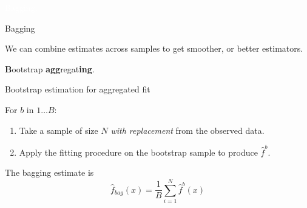 \documentclass[xcolor={table}, handout]{beamer}
\begin{document}


\begin{transitionframe}
\centering

\LARGE \textcolor{white}{Bagging.}

\end{transitionframe}
\begin{frame}{Bagging}

\begin{wideitemize}
\item We can combine estimates across samples to get smoother, or better estimators. \pause
\item \textcolor{Contrast6l}{\textbf{B}}ootstrap \textcolor{Contrast6l}{\textbf{agg}}regat\textcolor{Contrast6l}{\textbf{ing}}.
\end{wideitemize}

\end{frame}



\begin{frame}{Bootstrap estimation for aggregated fit}

\begin{wideitemize}
\item For $b$ in $1\dots B$:\pause
\begin{enumerate}

    \item Take a sample of size $N$  \textit{with replacement} from the observed data. \pause

    \item Apply the fitting procedure on the bootstrap sample to produce $\hat f^b$.
    \end{enumerate}
\pause
\item The bagging estimate is 
\[
\hat f_{bag}(x) = \frac{1}{B}\sum_{i = 1}^N \hat f^b(x)
\]
\end{wideitemize}

\end{frame}
\end{document}
